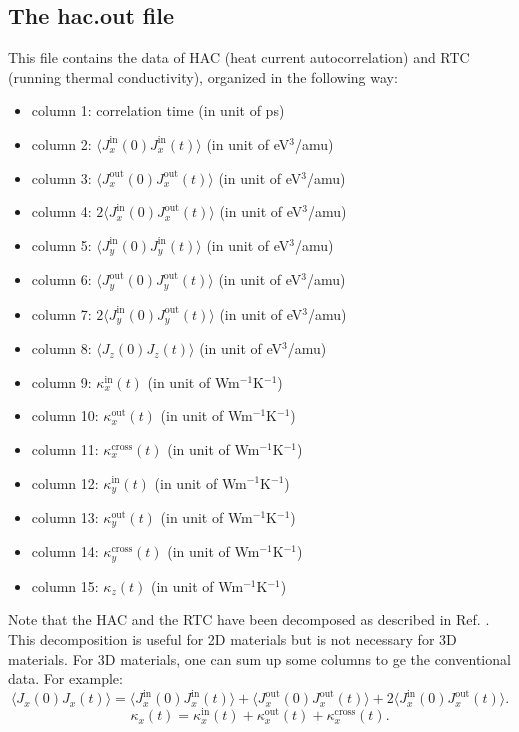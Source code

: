 \documentclass[12pt,a4paper]{report}
\begin{document}
\subsection{The hac.out file}

This file contains the data of HAC (heat current autocorrelation) and RTC (running thermal conductivity), organized in the following way:
\begin{itemize}
\item column 1: correlation time (in unit of ps)
\item column 2: $\langle J_x^{\text{in}}(0)J_x^{\text{in}}(t)\rangle$ (in unit of eV$^3$/amu)
\item column 3: $\langle J_x^{\text{out}}(0)J_x^{\text{out}}(t)\rangle$ (in unit of eV$^3$/amu)
\item column 4: $2\langle J_x^{\text{in}}(0)J_x^{\text{out}}(t)\rangle$ (in unit of eV$^3$/amu)
\item column 5: $\langle J_y^{\text{in}}(0)J_y^{\text{in}}(t)\rangle$ (in unit of eV$^3$/amu)
\item column 6: $\langle J_y^{\text{out}}(0)J_y^{\text{out}}(t)\rangle$ (in unit of eV$^3$/amu)
\item column 7: $2\langle J_y^{\text{in}}(0)J_y^{\text{out}}(t)\rangle$ (in unit of eV$^3$/amu)
\item column 8: $\langle J_z(0)J_z(t)\rangle$ (in unit of eV$^3$/amu)
\item column 9: $\kappa_x^{\text{in}}(t)$ (in unit of Wm$^{-1}$K$^{-1}$)
\item column 10: $\kappa_x^{\text{out}}(t)$ (in unit of Wm$^{-1}$K$^{-1}$)
\item column 11: $\kappa_x^{\text{cross}}(t)$ (in unit of Wm$^{-1}$K$^{-1}$)
\item column 12: $\kappa_y^{\text{in}}(t)$ (in unit of Wm$^{-1}$K$^{-1}$)
\item column 13: $\kappa_y^{\text{out}}(t)$ (in unit of Wm$^{-1}$K$^{-1}$)
\item column 14: $\kappa_y^{\text{cross}}(t)$ (in unit of Wm$^{-1}$K$^{-1}$)
\item column 15: $\kappa_z(t)$ (in unit of Wm$^{-1}$K$^{-1}$)
\end{itemize}

Note that the HAC and the RTC have been decomposed as described in Ref. \cite{fan2017prb}. This decomposition is useful for 2D materials but is not necessary for 3D materials. For 3D materials, one can sum up some columns to ge the conventional data. For example:
\begin{equation}
\langle J_x(0)J_x(t) \rangle =
\langle J_x^{\text{in}}(0)J_x^{\text{in}}(t) \rangle +
\langle J_x^{\text{out}}(0)J_x^{\text{out}}(t) \rangle +
2 \langle J_x^{\text{in}}(0)J_x^{\text{out}}(t) \rangle.
\end{equation}
\begin{equation}
\kappa_x(t) = \kappa_x^{\text{in}}(t) + \kappa_x^{\text{out}}(t) + \kappa_x^{\text{cross}}(t).
\end{equation}
\end{document}
